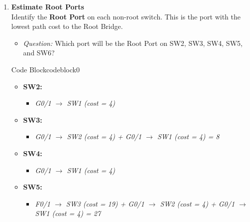 \documentclass[a4paper]{book}
\begin{document}
\begin{enumerate}


	\item \textbf{Estimate Root Ports} \\
	      Identify the \textbf{Root Port} on each non-root switch. This is the port with the lowest path cost to the Root Bridge.
	      \begin{itemize}
		      \item \textit{Question:} Which port will be the Root Port on SW2, SW3, SW4, SW5, and SW6?
	      \end{itemize}



	      \begin{ocg}{Code Block}{codeblock}{0}
		      \vspace{0.5cm}
		      \begin{tcolorbox}
			      \small{
				      \begin{itemize}
					      \item \textbf{SW2:}
					            \begin{itemize}
						            \item \textit{G0/1 $\rightarrow$ SW1 (cost = 4)}
					            \end{itemize}

					      \item \textbf{SW3:}
					            \begin{itemize}
						            \item \textit{G0/1 $\rightarrow$ SW2 (cost = 4) + G0/1 $\rightarrow$ SW1 (cost = 4) = 8}
					            \end{itemize}

					      \item \textbf{SW4:}
					            \begin{itemize}
						            \item \textit{G0/1 $\rightarrow$ SW1 (cost = 4)}
					            \end{itemize}

					      \item \textbf{SW5:}
					            \begin{itemize}
						            \item \textit{F0/1 $\rightarrow$ SW3 (cost = 19) + G0/1 $\rightarrow$ SW2 (cost = 4) + G0/1 $\rightarrow$ SW1 (cost = 4) = 27}
					            \end{itemize}


\end{itemize}}
\end{tcolorbox}
\end{ocg}
\end{enumerate}
\end{document}
